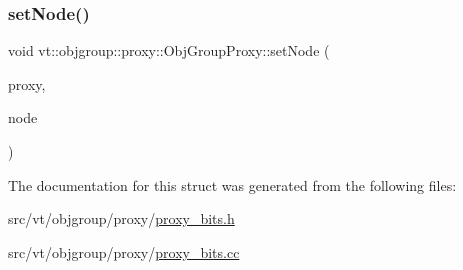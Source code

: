 \subsubsection{\texorpdfstring{set\+Node()}{setNode()}}
{\footnotesize\ttfamily void vt\+::objgroup\+::proxy\+::\+Obj\+Group\+Proxy\+::set\+Node (\begin{DoxyParamCaption}\item[{\hyperlink{namespacevt_ad7cae989df485fccca57f0792a880a8e}{Obj\+Group\+Proxy\+Type} \&}]{proxy,  }\item[{\hyperlink{namespacevt_a866da9d0efc19c0a1ce79e9e492f47e2}{Node\+Type} const \&}]{node }\end{DoxyParamCaption})\hspace{0.3cm}{\ttfamily [static]}}



The documentation for this struct was generated from the following files\+:\begin{DoxyCompactItemize}
\item 
src/vt/objgroup/proxy/\hyperlink{objgroup_2proxy_2proxy__bits_8h}{proxy\+\_\+bits.\+h}\item 
src/vt/objgroup/proxy/\hyperlink{objgroup_2proxy_2proxy__bits_8cc}{proxy\+\_\+bits.\+cc}\end{DoxyCompactItemize}
